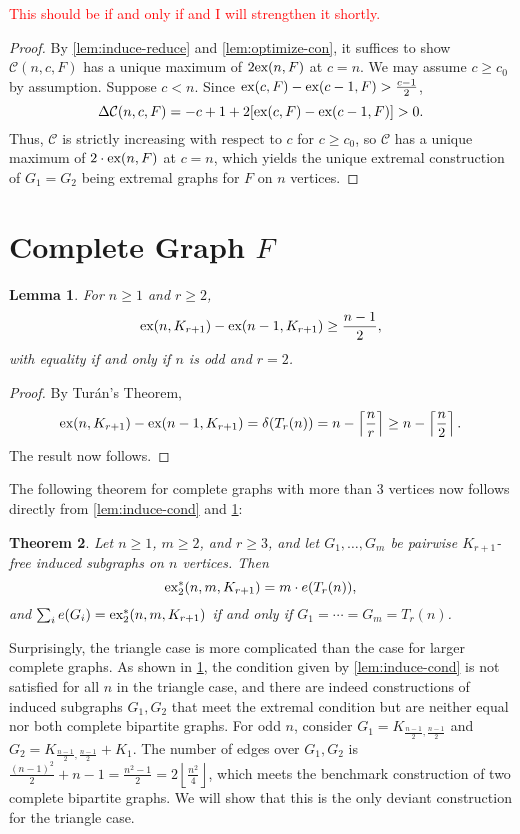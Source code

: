 \documentclass[12pt]{report}
\newtheorem{theorem}{Theorem}[chapter]
\newtheorem{lemma}[theorem]{Lemma}
\newcommand*{\ex}{\textnormal{ex}}
\newcommand*{\dex}{\textnormal{ex}_2}
\newcommand*{\con}{\mathcal{C}}
\begin{document}
\textcolor{red}{This should be if and only if and I will strengthen it shortly.}

\begin{proof}
  By \cref{lem:induce-reduce} and \cref{lem:optimize-con}, it suffices to show $\con(n, c, F)$ has a unique maximum of $2\ex(n, F)$ at $c = n$. We may assume $c \geq c_0$ by assumption. Suppose $c < n$. Since $\ex(c, F) - \ex(c - 1, F) > \frac{c - 1}{2}$,
  \[
    \Delta \con(n, c, F) = - c + 1 + 2[\ex(c, F) - \ex(c - 1, F)] > 0.
  \]
  Thus, $\con$ is strictly increasing with respect to $c$ for $c \geq c_0$, so $\con$ has a unique maximum of $2 \cdot \ex(n, F)$ at $c = n$, which yields the unique extremal construction of $G_1 = G_2$ being extremal graphs for $F$ on $n$ vertices.
\end{proof}

\section{Complete Graph $F$}

\begin{lemma}\label{lem:induce-complete-cond}
  For $n \geq 1$ and $r \geq 2$,
  \[
    \ex(n, K_{r + 1}) - \ex(n - 1, K_{r + 1}) \geq \frac{n - 1}{2},
  \]
  with equality if and only if $n$ is odd and $r = 2$.
\end{lemma}

\begin{proof}
  By Turán's Theorem,
  \[
    \ex(n, K_{r + 1}) - \ex(n - 1, K_{r + 1}) = \delta(T_r(n)) = n - \left\lceil \frac{n}{r} \right\rceil \geq n - \left\lceil\frac{n}{2}\right\rceil.
  \]
  The result now follows.
\end{proof}

The following theorem for complete graphs with more than $3$ vertices now follows directly from \cref{lem:induce-cond} and \cref{lem:induce-complete-cond}:

\begin{theorem}\label{thm:induce-complete-no-triangle}
  Let $n \geq 1$, $m \geq 2$, and $r \geq 3$, and let $G_1, \ldots, G_m$ be pairwise $K_{r + 1}$-free induced subgraphs on $n$ vertices. Then
  \[
    \dex^*(n, m, K_{r + 1}) = m \cdot e(T_{r}(n)),
  \]
  and $\sum_i e(G_i) = \dex^*(n, m, K_{r + 1})$ if and only if $G_1 = \cdots = G_m = T_{r}(n)$.
\end{theorem}

Surprisingly, the triangle case is more complicated than the case for larger complete graphs. As shown in \cref{lem:induce-complete-cond}, the condition given by \cref{lem:induce-cond} is not satisfied for all $n$ in the triangle case, and there are indeed constructions of induced subgraphs $G_1, G_2$ that meet the extremal condition but are neither equal nor both complete bipartite graphs. For odd $n$, consider $G_1 = K_{\frac{n - 1}{2}, \frac{n - 1}{2}}$ and $G_2 = K_{\frac{n - 1}{2}, \frac{n - 1}{2}} + K_1$. The number of edges over $G_1, G_2$ is $\frac{(n - 1)^2}{2} + n - 1 = \frac{n^2 - 1}{2} = 2\left\lfloor \frac{n^2}{4}\right\rfloor$, which meets the benchmark construction of two complete bipartite graphs. We will show that this is the only deviant construction for the triangle case.
\end{document}
